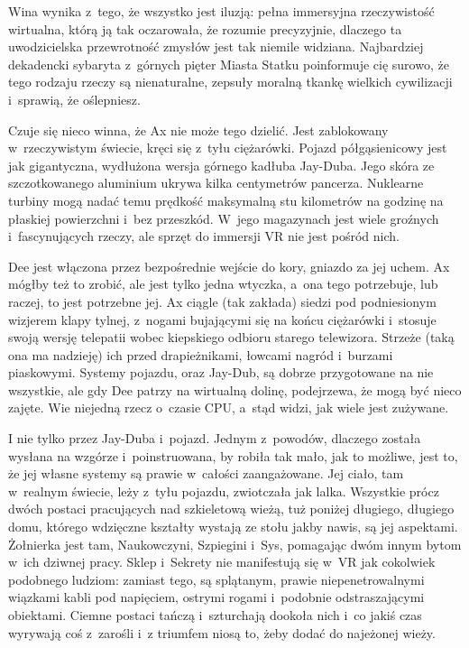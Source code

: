 \documentclass[oneside,polish,11pt,sfheadings]{mwbk}
\begin{document}
Wina wynika z~tego, że wszystko jest iluzją: pełna immersyjna
rzeczywistość wirtualna, którą ją tak oczarowała, że rozumie
precyzyjnie, dlaczego ta uwodzicielska przewrotność zmysłów jest tak
niemile widziana. Najbardziej dekadencki sybaryta z~górnych pięter
Miasta Statku poinformuje cię surowo, że tego rodzaju rzeczy są
nienaturalne, zepsuły moralną tkankę wielkich cywilizacji i~sprawią, że
oślepniesz.

Czuje się nieco winna, że Ax nie może tego dzielić. Jest zablokowany w~rzeczywistym świecie, kręci się z~tyłu ciężarówki. Pojazd półgąsienicowy
jest jak gigantyczna, wydłużona wersja górnego kadłuba Jay-Duba. Jego
skóra ze szczotkowanego aluminium ukrywa kilka centymetrów pancerza.
Nuklearne turbiny mogą nadać temu prędkość maksymalną stu kilometrów na
godzinę na płaskiej powierzchni i~bez przeszkód. W~jego magazynach jest
wiele groźnych i~fascynujących rzeczy, ale sprzęt do immersji VR nie
jest pośród nich.

Dee jest włączona przez bezpośrednie wejście do kory, gniazdo za jej
uchem. Ax mógłby też to zrobić, ale jest tylko jedna wtyczka, a~ona tego
potrzebuje, lub raczej, to jest potrzebne jej. Ax ciągle (tak zakłada)
siedzi pod podniesionym wizjerem klapy tylnej, z~nogami bujającymi się
na końcu ciężarówki i~stosuje swoją wersję telepatii wobec kiepskiego
odbioru starego telewizora. Strzeże (taką ona ma nadzieję) ich przed
drapieżnikami, łowcami nagród i~burzami piaskowymi. Systemy pojazdu,
oraz Jay-Dub, są dobrze przygotowane na nie wszystkie, ale gdy Dee patrzy
na wirtualną dolinę, podejrzewa, że mogą być nieco zajęte. Wie niejedną
rzecz o~czasie CPU, a~stąd widzi, jak wiele jest zużywane.

I nie tylko przez Jay-Duba i~pojazd. Jednym z~powodów, dlaczego została
wysłana na wzgórze i~poinstruowana, by robiła tak mało, jak to możliwe,
jest to, że jej własne systemy są prawie w~całości zaangażowane. Jej
ciało, tam w~realnym świecie, leży z~tyłu pojazdu, zwiotczała jak lalka.
Wszystkie prócz dwóch postaci pracujących nad szkieletową wieżą, tuż
poniżej długiego, długiego domu, którego wdzięczne kształty wystają ze
stołu jakby nawis, są jej aspektami. Żołnierka jest tam, Naukowczyni,
Szpiegini i~Sys, pomagając dwóm innym bytom w~ich dziwnej pracy. Sklep i~Sekrety nie manifestują się w~VR jak cokolwiek podobnego ludziom:
zamiast tego, są splątanym, prawie niepenetrowalnymi wiązkami kabli pod
napięciem, ostrymi rogami i~podobnie odstraszającymi obiektami. Ciemne
postaci tańczą i~szturchają dookoła nich i~co jakiś czas wyrywają coś z~zarośli i~z triumfem niosą to, żeby dodać do najeżonej wieży.
\end{document}
